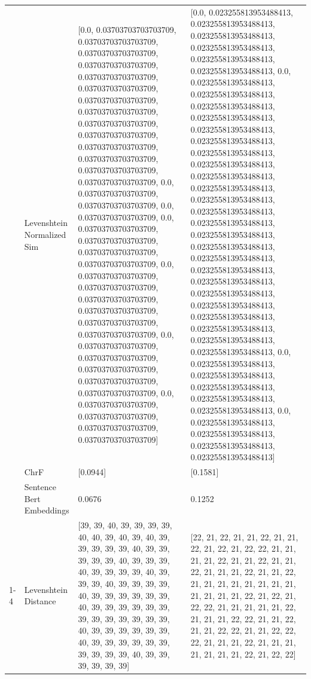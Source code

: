 \begin{tabular}{llll}
 & Levenshtein Normalized Sim & [0.0, 0.03703703703703709, 0.03703703703703709, 0.03703703703703709, 0.03703703703703709, 0.03703703703703709, 0.03703703703703709, 0.03703703703703709, 0.03703703703703709, 0.03703703703703709, 0.03703703703703709, 0.03703703703703709, 0.03703703703703709, 0.03703703703703709, 0.03703703703703709, 0.0, 0.03703703703703709, 0.03703703703703709, 0.0, 0.03703703703703709, 0.0, 0.03703703703703709, 0.03703703703703709, 0.03703703703703709, 0.03703703703703709, 0.0, 0.03703703703703709, 0.03703703703703709, 0.03703703703703709, 0.03703703703703709, 0.03703703703703709, 0.03703703703703709, 0.0, 0.03703703703703709, 0.03703703703703709, 0.03703703703703709, 0.03703703703703709, 0.03703703703703709, 0.0, 0.03703703703703709, 0.03703703703703709, 0.03703703703703709, 0.03703703703703709] & [0.0, 0.023255813953488413, 0.023255813953488413, 0.023255813953488413, 0.023255813953488413, 0.023255813953488413, 0.023255813953488413, 0.0, 0.023255813953488413, 0.023255813953488413, 0.023255813953488413, 0.023255813953488413, 0.023255813953488413, 0.023255813953488413, 0.023255813953488413, 0.023255813953488413, 0.023255813953488413, 0.023255813953488413, 0.023255813953488413, 0.023255813953488413, 0.023255813953488413, 0.023255813953488413, 0.023255813953488413, 0.023255813953488413, 0.023255813953488413, 0.023255813953488413, 0.023255813953488413, 0.023255813953488413, 0.023255813953488413, 0.023255813953488413, 0.023255813953488413, 0.023255813953488413, 0.0, 0.023255813953488413, 0.023255813953488413, 0.023255813953488413, 0.023255813953488413, 0.023255813953488413, 0.0, 0.023255813953488413, 0.023255813953488413, 0.023255813953488413, 0.023255813953488413] \\
 & ChrF & [0.0944] & [0.1581] \\
 & Sentence Bert Embeddings & 0.0676 & 0.1252 \\
\cline{1-4}
\multirow[t]{4}{*}{Amaka amalungi gakola ekibanja ekiningi.} & Levenshtein Distance & [39, 39, 40, 39, 39, 39, 39, 40, 40, 39, 40, 39, 40, 39, 39, 39, 39, 39, 40, 39, 39, 39, 39, 39, 40, 39, 39, 39, 40, 39, 39, 39, 39, 40, 39, 39, 39, 40, 39, 39, 39, 39, 40, 39, 39, 39, 39, 39, 39, 40, 39, 39, 39, 39, 39, 39, 39, 39, 39, 39, 39, 39, 39, 40, 39, 39, 39, 39, 39, 39, 40, 39, 39, 39, 39, 39, 39, 39, 39, 39, 39, 40, 39, 39, 39, 39, 39, 39] & [22, 21, 22, 21, 21, 22, 21, 21, 22, 21, 22, 21, 22, 22, 21, 21, 21, 21, 22, 21, 21, 22, 21, 21, 22, 21, 21, 21, 22, 21, 21, 22, 21, 21, 21, 21, 21, 21, 21, 21, 21, 21, 21, 21, 22, 21, 22, 21, 22, 22, 21, 21, 21, 21, 21, 22, 21, 21, 21, 22, 22, 21, 21, 22, 21, 21, 22, 22, 21, 21, 22, 22, 22, 21, 21, 21, 22, 21, 21, 21, 21, 21, 21, 21, 22, 21, 22, 22] \\

\end{tabular}
